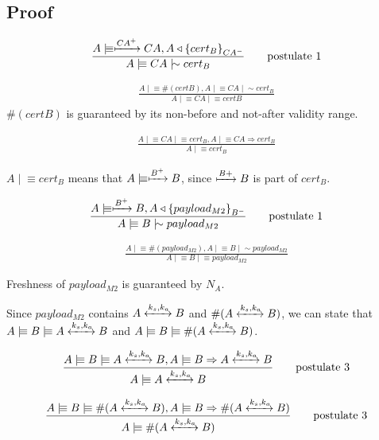 \documentclass[a4paper,12pt]{article}
\newcommand{\believes}{\mid\!\equiv}
\newcommand{\sees}{\triangleleft}
\newcommand{\oncesaid}{\mid\!\sim}
\newcommand{\controls}{\Rightarrow}
\newcommand{\fresh}[1]{\#(#1)}
\newcommand{\encrypt}[2]{{ \{ #1 \} }_{#2}}
\newcommand{\sharekey}[1]{\xleftrightarrow{#1}}
\newcommand{\pubkey}[1]{\xmapsto{#1}}
\begin{document}
\subsection{Proof}

\begin{align}
\frac{A \believes \pubkey{CA^+} CA, A \sees \encrypt{cert_B}{CA^-}}{A \believes CA \oncesaid cert_B} \tag*{postulate 1}
\end{align}

\begin{align}
\frac{A \believes \fresh{certB}, A \believes CA \oncesaid cert_B}{A \believes CA \believes certB} \tag*{postulate 2}
\end{align}
$\fresh{certB}$ is guaranteed by its non-before and not-after validity range.

\begin{align}
\frac{A \believes CA \believes cert_B, A \believes CA \controls cert_B}{A \believes cert_B} \tag*{postulate 3}
\end{align}

$A \believes cert_B$ means that $A \believes \pubkey{B^+} B$, since $\pubkey{B+} B$ is part of $cert_B$.

\begin{align}
\frac{A \believes \pubkey{B^+} B, A \sees \encrypt{payload_{M2}}{B^-}}{A \believes B \oncesaid payload_{M2}} \tag*{postulate 1}
\end{align}

\begin{align}
\frac{A \believes \fresh{payload_{M2}}, A \believes B \oncesaid payload_{M2}}{A \believes B \believes payload_{M2}} \tag*{postulate 2}
\end{align}

Freshness of $payload_{M2}$ is guaranteed by $N_A$.

Since $payload_{M2}$ contains $A \sharekey{k_s, k_a} B$ and $\fresh{A \sharekey{k_s, k_a} B}$, we can state that $A \believes B \believes A \sharekey{k_s, k_a} B$ and $A \believes B \believes \fresh{A \sharekey{k_s, k_a} B}$.

\begin{align}
\frac{A \believes B \believes A \sharekey{k_s, k_a} B, A \believes B \controls A \sharekey{k_s, k_a} B}{A \believes A \sharekey{k_s, k_a} B} \tag*{postulate 3}
\end{align}

\begin{align}
\frac{A \believes B \believes \fresh{A \sharekey{k_s, k_a} B}, A \believes B \controls \fresh{A \sharekey{k_s, k_a} B}}{A \believes \fresh{A \sharekey{k_s, k_a} B}} \tag*{postulate 3}
\end{align}
\end{document}
